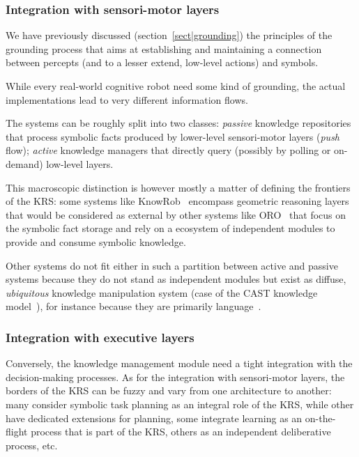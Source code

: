 \subsubsection{Integration with sensori-motor layers}
\label{sect|integration-sensorimotor}

We have previously discussed (section~\ref{sect|grounding}) the principles of
the grounding process that aims at establishing and maintaining a connection
between percepts (and to a lesser extend, low-level actions) and symbols.

While every real-world cognitive robot need some kind of grounding, the actual
implementations lead to very different information flows.

The systems can be roughly split into two classes: \emph{passive} knowledge
repositories that process symbolic facts produced by lower-level sensori-motor
layers (\emph{push} flow); \emph{active} knowledge managers that directly query
(possibly by polling or on-demand) low-level layers.

This macroscopic distinction is however mostly a matter of defining the
frontiers of the KRS: some systems like KnowRob~\cite{Tenorth2009a} encompass
geometric reasoning layers that would be considered as external by other
systems like ORO~\cite{Lemaignan2010} that focus on the symbolic fact storage
and rely on a ecosystem of independent modules to provide and consume symbolic
knowledge.


Other systems do not fit either in such a partition between active and passive
systems because they do not stand as independent modules but exist as diffuse,
\emph{ubiquitous} knowledge manipulation system (case of the CAST knowledge
model~\cite{Jacobsson2008}), for instance because they are primarily
language~\cite{Ferrein2008, Sabri2011}.

\subsubsection{Integration with executive layers}
\label{sect|integration-executive-layers}

Conversely, the knowledge management module need a tight integration with the
decision-making processes. As for the integration with sensori-motor
layers, the borders of the KRS can be fuzzy and vary from one architecture to
another: many consider symbolic task planning as an integral role of the KRS,
while other have dedicated extensions for planning, some integrate learning as
an on-the-flight process that is part of the KRS, others as an independent
deliberative process, etc.

